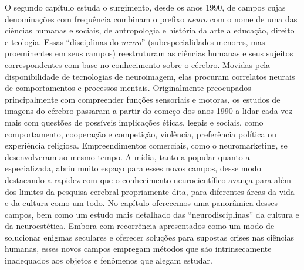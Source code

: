 O segundo capítulo estuda o surgimento, desde os anos 1990, de campos
cujas denominações com frequência combinam o prefixo \emph{neuro} com o
nome de uma das ciências humanas e sociais, de antropologia e história
da arte a educação, direito e teologia. Essas ``disciplinas do
\emph{neuro}'' (subespecialidades menores, mas proeminentes em seus
campos) reestruturam as ciências humanas e seus sujeitos correspondentes
com base no conhecimento sobre o cérebro. Movidas pela disponibilidade
de tecnologias de neuroimagem, elas procuram correlatos neurais de
comportamentos e processos mentais. Originalmente preocupados
principalmente com compreender funções sensoriais e motoras, os estudos
de imagens do cérebro passaram a partir do começo dos anos 1990 a lidar
cada vez mais com questões de possíveis implicações éticas, legais e
sociais, como comportamento, cooperação e competição, violência,
preferência política ou experiência religiosa. Empreendimentos
comerciais, como o neuromarketing, se desenvolveram ao mesmo tempo. A
mídia, tanto a popular quanto a especializada, abriu muito espaço para
esses novos campos, desse modo destacando a rapidez com que o
conhecimento neurocientífico avança para além dos limites da pesquisa
cerebral propriamente dita, para diferentes áreas da vida e da cultura
como um todo. No capítulo oferecemos uma panorâmica desses campos, bem
como um estudo mais detalhado das ``neurodisciplinas'' da cultura e da
neuroestética. Embora com recorrência apresentados como um modo de
solucionar enigmas seculares e oferecer soluções para supostas crises
nas ciências humanas, esses novos campos empregam métodos que são
intrinsecamente inadequados aos objetos e fenômenos que alegam estudar.

